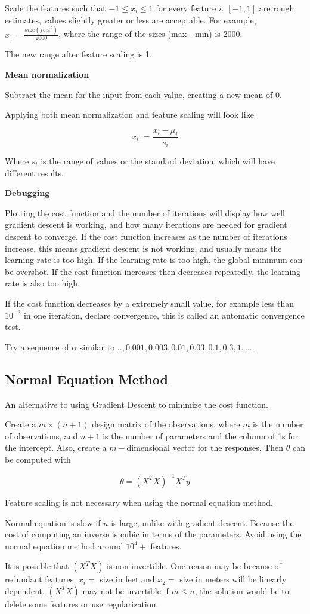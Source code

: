 \documentclass[
]{article}
\begin{document}
Scale the features such that \(-1 \le x_i \le 1\) for every feature
\(i\). \([-1,1]\) are rough estimates, values slightly greater or less
are acceptable. For example, \(x_1 = \frac{size (feet^2) }{2000}\),
where the range of the sizes (max - min) is 2000.

The new range after feature scaling is 1.

\textbf{Mean normalization}

Subtract the mean for the input from each value, creating a new mean of
0.

Applying both mean normalization and feature scaling will look like

\[x_i := \frac{x_i-\mu_i}{s_i}\]

Where \(s_i\) is the range of values or the standard deviation, which
will have different results.

\textbf{Debugging}

Plotting the cost function and the number of iterations will display how
well gradient descent is working, and how many iterations are needed for
gradient descent to converge. If the cost function increases as the
number of iterations increase, this means gradient descent is not
working, and usually means the learning rate is too high. If the
learning rate is too high, the global minimum can be overshot. If the
cost function increases then decreases repeatedly, the learning rate is
also too high.

If the cost function decreases by a extremely small value, for example
less than \(10^{-3}\) in one iteration, declare convergence, this is
called an automatic convergence test.

Try a sequence of \(\alpha\) similar to
\(..,0.001, 0.003, 0.01, 0.03, 0.1, 0.3, 1,...\).

\hypertarget{header-n23}{%
\subsection{Normal Equation Method}\label{header-n23}}

An alternative to using Gradient Descent to minimize the cost function.

Create a \(m \times (n+1)\) design matrix of the observations, where
\(m\) is the number of observations, and \(n+1\) is the number of
parameters and the column of 1s for the intercept. Also, create a
\(m-\)dimensional vector for the responses. Then \(\theta\) can be
computed with

\[\theta = (X^TX)^{-1}X^Ty\]

Feature scaling is not necessary when using the normal equation method.

Normal equation is slow if \(n\) is large, unlike with gradient descent.
Because the cost of computing an inverse is cubic in terms of the
parameters. Avoid using the normal equation method around \(10^4+\)
features.

It is possible that \((X^TX)\) is non-invertible. One reason may be
because of redundant features, \(x_i =\) size in feet and \(x_2 =\) size
in meters will be linearly dependent. \((X^TX)\) may not be invertible
if \(m \le n\), the solution would be to delete some features or use
regularization.
\end{document}
